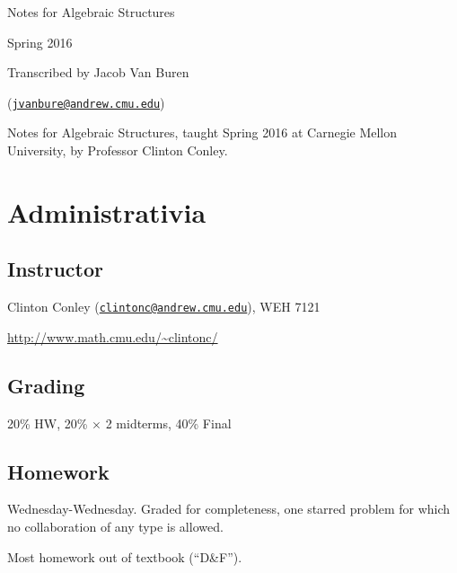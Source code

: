\documentclass[notes.tex]{subfiles}
\begin{document}
\begin{titlepage}
\begin{minipage}{\textwidth}
	\begin{center}
		{\LARGE\selectfont Notes for Algebraic Structures\vspace{1em}

		\large Spring 2016}\vspace{2em}

		Transcribed by Jacob Van Buren 

		(\href{mailto:jvanbure@andrew.cmu.edu}{\nolinkurl{jvanbure@andrew.cmu.edu}})

		\vspace{0.5in}
		{\fontsize{11pt}{0pt}\selectfont
		Notes for Algebraic Structures, taught Spring 2016 at Carnegie Mellon University, by Professor Clinton Conley.
		}
	\end{center}
\end{minipage}
\vfill
\begin{minipage}{\textwidth}
	\section*{Administrativia}
	\subsection*{Instructor}
	Clinton Conley (\href{mailto:clintonc@andrew.cmu.edu}{\nolinkurl{clintonc@andrew.cmu.edu}}), WEH 7121

	\url{http://www.math.cmu.edu/~clintonc/}

	\subsection*{Grading}
	20\% HW, 
	20\% $\times$ 2 midterms,
	40\% Final

	\subsection*{Homework} Wednesday-Wednesday.
	Graded for completeness, one starred problem for which no collaboration of any type is allowed.

	Most homework out of textbook (``D\&F'').
\end{minipage}
\vspace{1in}
\end{titlepage}
\end{document}
